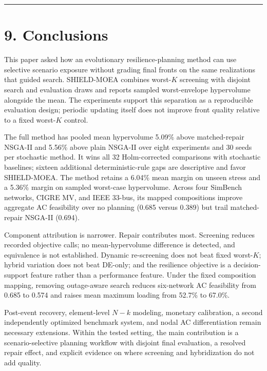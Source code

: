 \documentclass[
  10pt,
  a4paper,
]{article}
\begin{document}
\begin{center}\rule{0.5\linewidth}{0.5pt}\end{center}

\section{9. Conclusions}\label{conclusions}

This paper asked how an evolutionary resilience-planning method can use
selective scenario exposure without grading final fronts on the same
realizations that guided search. SHIELD-MOEA combines worst-\(K\)
screening with disjoint search and evaluation draws and reports sampled
worst-envelope hypervolume alongside the mean. The experiments support
this separation as a reproducible evaluation design; periodic updating
itself does not improve front quality relative to a fixed worst-\(K\)
control.

The full method has pooled mean hypervolume 5.09\% above matched-repair
NSGA-II and 5.56\% above plain NSGA-II over eight experiments and 30
seeds per stochastic method. It wins all 32 Holm-corrected comparisons
with stochastic baselines; sixteen additional deterministic-rule gaps
are descriptive and favor SHIELD-MOEA. The method retains a 6.04\% mean
margin on unseen stress and a 5.36\% margin on sampled worst-case
hypervolume. Across four SimBench networks, CIGRE MV, and IEEE 33-bus,
its mapped compositions improve aggregate AC feasibility over no
planning (0.685 versus 0.389) but trail matched-repair NSGA-II (0.694).

Component attribution is narrower. Repair contributes most. Screening
reduces recorded objective calls; no mean-hypervolume difference is
detected, and equivalence is not established. Dynamic re-screening does
not beat fixed worst-\(K\); hybrid variation does not beat DE-only; and
the resilience objective is a decision-support feature rather than a
performance feature. Under the fixed composition mapping, removing
outage-aware search reduces six-network AC feasibility from 0.685 to
0.574 and raises mean maximum loading from 52.7\% to 67.0\%.

Post-event recovery, element-level \(N-k\) modeling, monetary
calibration, a second independently optimized benchmark system, and
nodal AC differentiation remain necessary extensions. Within the tested
setting, the main contribution is a scenario-selective planning workflow
with disjoint final evaluation, a resolved repair effect, and explicit
evidence on where screening and hybridization do not add quality.
\end{document}
